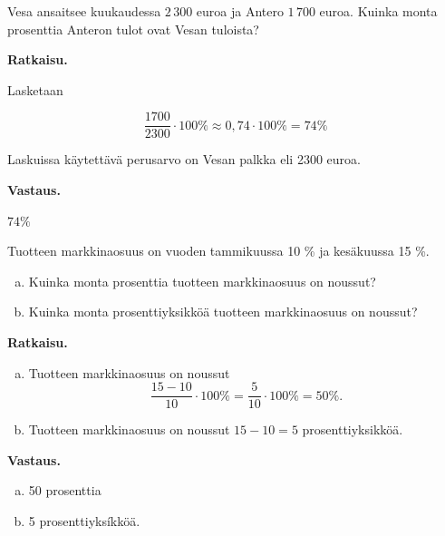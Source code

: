 \begin{esimerkki}
Vesa ansaitsee kuukaudessa ${2\,300}$ euroa ja Antero ${1\,700}$ euroa. Kuinka monta prosenttia Anteron tulot ovat Vesan tuloista? 

\textbf{Ratkaisu.}

Lasketaan

\begin{equation*}
\frac{1700}{2300} \cdot 100 \%  \approx 0,74\cdot 100 \% = 74 \%
\end{equation*}

Laskuissa käytettävä perusarvo on Vesan palkka eli 2300 euroa.
    
\textbf{Vastaus.}

$74 \%$
\end{esimerkki}





\begin{esimerkki}
    Tuotteen markkinaosuus on vuoden tammikuussa 10 \% ja kesäkuussa 15 \%. 
    \begin{enumerate}[a)]
    \item Kuinka monta prosenttia tuotteen markkinaosuus on noussut?
    
    \item Kuinka monta prosenttiyksikköä tuotteen markkinaosuus on noussut?
    \end{enumerate}
    
    {\bf Ratkaisu.} 
    
    \begin{enumerate}[a)]
    \item Tuotteen markkinaosuus on noussut
    \[
    \frac{15-10}{10} \cdot 100 \%= \frac{5}{10}\cdot 100\% = 50\%.
    \]
    
    \item Tuotteen markkinaosuus on noussut $15-10=5$ prosenttiyksikköä. 
    \end{enumerate}
    
    {\bf Vastaus.}
    
    \begin{enumerate}[a)]
    \item 50 prosenttia
    \item 5 prosenttiyksíkköä.
    \end{enumerate}
\end{esimerkki}

